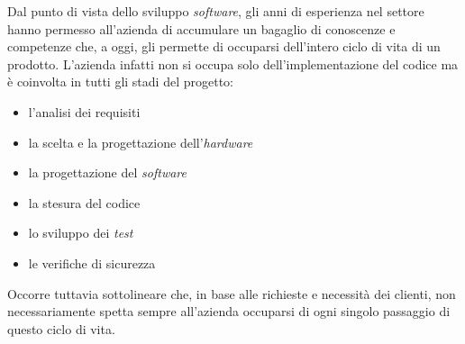 \noindent
Dal punto di vista dello sviluppo \textit{software}, gli anni di esperienza nel settore hanno permesso all'azienda di accumulare un bagaglio di conoscenze e competenze che, a oggi, gli permette di occuparsi dell'intero ciclo di vita di un prodotto.
L'azienda infatti non si occupa solo dell'implementazione del codice ma è coinvolta in tutti gli stadi del progetto:
\begin{itemize}
    \itemsep0em
    \item l'analisi dei requisiti
    \item la scelta e la progettazione dell'\textit{hardware}
    \item la progettazione del \textit{software}
    \item la stesura del codice
    \item lo sviluppo dei \textit{test}
    \item le verifiche di sicurezza
\end{itemize}
Occorre tuttavia sottolineare che, in base alle richieste e necessità dei clienti, non necessariamente spetta sempre all'azienda occuparsi di ogni singolo passaggio di questo ciclo di vita.\\

